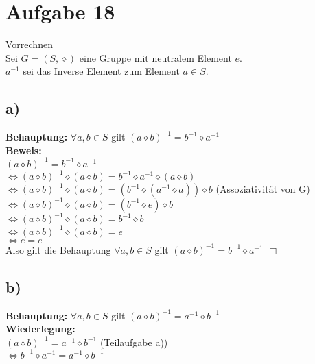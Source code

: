 \documentclass[paper = a4, ngerman]{scrartcl}
\begin{document}
	
	
	\section*{Aufgabe 18}
	Vorrechnen\\
	Sei $G = (S,\diamond)$ eine Gruppe mit neutralem Element $e$.\\
	$a^{-1}$ sei das Inverse Element zum Element $a \in S$.\\
	
	\subsection*{a)}
	\textbf{Behauptung:} $\forall a,b \in S$ gilt $ (a \diamond b)^{-1} = b^{-1} \diamond a^{-1}$\\
	
	\textbf{Beweis:}\\
	$ (a \diamond b)^{-1} = b^{-1} \diamond a^{-1}$\\
	$\Leftrightarrow (a \diamond b)^{-1} \diamond (a \diamond b)= b^{-1} \diamond a^{-1} \diamond(a \diamond b)$\\
	$\Leftrightarrow (a \diamond b)^{-1} \diamond (a \diamond b)= (b^{-1} \diamond (a^{-1} \diamond a)) \diamond b$ \hspace{10mm} (Assoziativität von G)\\
	$\Leftrightarrow (a \diamond b)^{-1} \diamond (a \diamond b)= (b^{-1} \diamond e) \diamond b$\\
	$\Leftrightarrow (a \diamond b)^{-1} \diamond (a \diamond b)= b^{-1} \diamond b$\\
	$\Leftrightarrow (a \diamond b)^{-1} \diamond (a \diamond b)= e$\\
	$\Leftrightarrow e= e$\\
	
	Also gilt die Behauptung $\forall a,b \in S$ gilt $ (a \diamond b)^{-1} = b^{-1} \diamond a^{-1}$
	\hfill$\Box$\\
	
	\subsection*{b)}
	\textbf{Behauptung:} $\forall a,b \in S$ gilt $ (a \diamond b)^{-1} = a^{-1} \diamond b^{-1}$\\
	
	\textbf{Wiederlegung:}\\
	$ (a \diamond b)^{-1} = a^{-1} \diamond b^{-1}$  (Teilaufgabe a))\\
	$\Leftrightarrow b^{-1} \diamond a^{-1} = a^{-1} \diamond b^{-1}$\\
	
\end{document}
